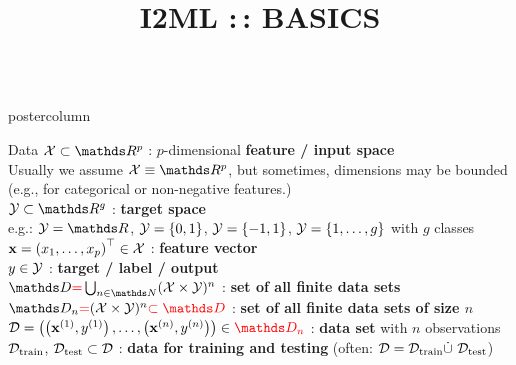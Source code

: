 \documentclass{beamer}
\title{I2ML :\,: BASICS} %
\newlength{\columnheight} %
\begin{document}
\begin{frame}[fragile]{}
\vspace{-8ex}
\begin{columns}
	\begin{column}{.31\textwidth}
		\begin{beamercolorbox}[center]{postercolumn}
			\begin{minipage}{.98\textwidth}
				\parbox[t][\columnheight]{\textwidth}{
					\begin{myblock}{Data}
					   $\Xspace \subset \R^p$ : $p$-dimensional \textbf{feature / input space}\\ 
            \hspace*{1ex}Usually we assume $\Xspace \equiv \R^p$, but sometimes, dimensions may be bounded (e.g., for categorical or non-negative features.)    \\
            
            $\Yspace \subset \R^g$ : \textbf{target space} \\ 
            \hspace*{1ex}e.g.: $\Yspace = \R$, $\mathcal{Y} = \lbrace 0, 1 \rbrace$, $\mathcal{Y} = \lbrace -1, 1 \rbrace$, $\mathcal{Y} = \{1, \ldots, g\}$ with $g$ classes\\
            
            $\mathbf{x} = \left(x_1, \ldots, x_p\right)^\top \in \mathcal{X}$ : \textbf{feature vector} \\ 
             
            $y \in \mathcal{Y}$ : \textbf{target / label / output} \\
             
            $\allDatasets \textcolor{red}{=} \defAllDatasets$ : \textbf{set of all finite data sets} \\
             
            $\allDatasetsn \textcolor{red}{=} \defAllDatasetsn \textcolor{red}{\subset \allDatasets}$ : \textbf{set of all finite data sets of size $n$} \\
             
            $\D = \Dset \in \textcolor{red}{\allDatasetsn} $ : \textbf{data set} with $n$ observations \\
             
            $\mathcal{D}_{\text{train}}$, $\mathcal{D}_{\text{test}} \subset \mathcal{D}$ : \textbf{data for training and testing} (often: $\mathcal{D} = \mathcal{D}_{\text{train}} \dot{\cup} ~ \mathcal{D}_{\text{test}}$)\\
             

\end{myblock}}
\end{minipage}
\end{beamercolorbox}
\end{column}
\end{columns}
\end{frame}
\end{document}
